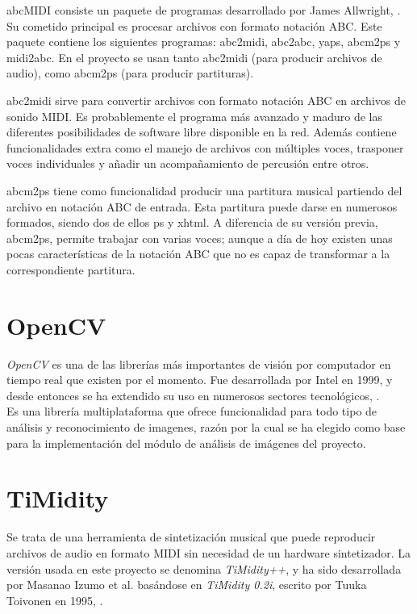 abcMIDI consiste un paquete de programas desarrollado por James Allwright, \cite{abcMIDIDescrip}. Su cometido principal es procesar archivos con formato notación ABC. Este paquete contiene los siguientes programas: abc2midi, abc2abc, yaps, abcm2ps y midi2abc. En el proyecto se usan tanto abc2midi (para producir archivos de audio), como abcm2ps (para producir partituras).

abc2midi sirve para convertir archivos con formato notación ABC en archivos de sonido MIDI. Es probablemente el programa más avanzado y maduro de las diferentes posibilidades de software libre disponible en la red. Además contiene funcionalidades extra como el manejo de archivos con múltiples voces, trasponer voces individuales y añadir un acompañamiento de percusión entre otros.

abcm2ps tiene como funcionalidad producir una partitura musical partiendo del archivo en notación ABC de entrada. Esta partitura puede darse en numerosos formados, siendo dos de ellos ps y xhtml. A diferencia de su versión previa, abcm2ps, permite trabajar con varias voces; aunque a día de hoy existen unas pocas características de la notación ABC que no es capaz de transformar a la correspondiente partitura.


\section{OpenCV}
\label{sec:OpenCV}

\emph{OpenCV} es una de las librerías más importantes de visión por computador en tiempo real que existen por el momento. Fue desarrollada por Intel en 1999, y desde entonces se ha extendido su uso en numerosos sectores tecnológicos, \cite{opencvDoc}.\\

Es una librería multiplataforma que ofrece funcionalidad para todo tipo de análisis y reconocimiento de imagenes, razón por la cual se ha elegido como base para la implementación del módulo de análisis de imágenes del proyecto.



\section{TiMidity}
\label{sec:Timidity}

Se trata de una herramienta de sintetización musical que puede reproducir archivos de audio en formato MIDI sin necesidad de un hardware sintetizador. La versión usada en este proyecto se denomina \emph{TiMidity++}, y ha sido desarrollada por Masanao Izumo et al. basándose en \emph{TiMidity 0.2i}, escrito por Tuuka Toivonen en 1995, \cite{timidity}.\\

